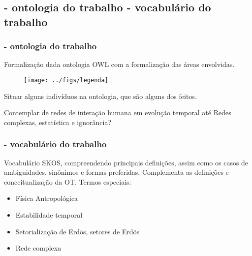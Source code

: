 \documentclass[10pt]{beamer}
\begin{document}
\subsection{- ontologia do trabalho \;\; - vocabulário do trabalho}
\begin{frame}
\frametitle{- ontologia do trabalho}
Formalização dada ontologia OWL com a formalização das
áreas envolvidas. 


\vspace{1cm}
\begin{figure}[!h]
    \texttt{[image: ../figs/legenda]}
\end{figure}

\vspace{1cm}

Situar alguns indivíduos na ontologia, que são alguns dos feitos.


Contemplar de redes de interação humana em evolução temporal até Redes complexas, estatística e ignorância?

\end{frame}
\begin{frame}
\frametitle{- vocabulário do trabalho}
Vocabulário SKOS, compreendendo principais definições, assim como 
os casos de ambiguidades, sinônimos e formas preferidas.
Complementa as definições
e conceitualização da OT. Termos especiais:
\begin{itemize}
	\item Física Antropológica
	\item Estabilidade temporal
	\item Setorialização de Erdös, setores de Erdös
	\item Rede complexa
\end{itemize}
\end{frame}
\end{document}
